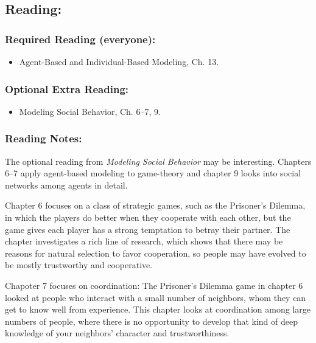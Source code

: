 \documentclass[
]{article}
\providecommand{\tightlist}{%
  \setlength{\itemsep}{0pt}\setlength{\parskip}{0pt}}
\begin{document}
\subsection{Reading:}\label{reading-13}

\subsubsection{Required Reading
(everyone):}\label{required-reading-everyone-12}

\begin{itemize}
\tightlist
\item
  Agent-Based and Individual-Based Modeling, Ch. 13.
\end{itemize}

\subsubsection{Optional Extra Reading:}\label{optional-extra-reading-3}

\begin{itemize}
\tightlist
\item
  Modeling Social Behavior, Ch. 6--7, 9.
\end{itemize}

\subsubsection{Reading Notes:}\label{reading-notes-12}

The optional reading from \emph{Modeling Social Behavior} may be
interesting. Chapters 6--7 apply agent-based modeling to game-theory and
chapter 9 looks into social networks among agents in detail.

Chapter 6 focuses on a class of strategic games, such as the Prisoner's
Dilemma, in which the players do better when they cooperate with each
other, but the game gives each player has a strong temptation to betray
their partner. The chapter investigates a rich line of research, which
shows that there may be reasons for natural selection to favor
cooperation, so people may have evolved to be mostly trustworthy and
cooperative.

Chapoter 7 focuses on coordination: The Prisoner's Dilemma game in
chapter 6 looked at people who interact with a small number of
neighbors, whom they can get to know well from experience. This chapter
looks at coordination among large numbers of people, where there is no
opportunity to develop that kind of deep knowledge of your neighbors'
character and trustworthiness.
\end{document}
